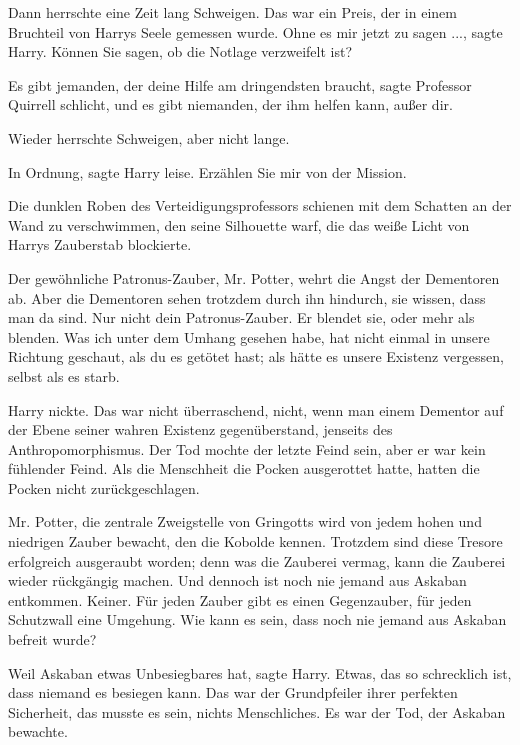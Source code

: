 Dann herrschte eine Zeit lang Schweigen. Das war ein Preis, der in einem
Bruchteil von Harrys Seele gemessen wurde. \glqq{}Ohne es mir jetzt zu sagen
...\grqq{}, sagte Harry. \glqq{}Können Sie sagen, ob die Notlage verzweifelt
ist?\grqq{}

\glqq{}Es gibt jemanden, der deine Hilfe am dringendsten braucht\grqq{}, sagte
Professor Quirrell schlicht, \glqq{}und es gibt niemanden, der ihm helfen kann,
außer dir.\grqq{}

Wieder herrschte Schweigen, aber nicht lange.

\glqq{}In Ordnung\grqq{}, sagte Harry leise. \glqq{}Erzählen Sie mir von der
Mission.\grqq{}

Die dunklen Roben des Verteidigungsprofessors schienen mit dem Schatten an der
Wand zu verschwimmen, den seine Silhouette warf, die das weiße Licht von Harrys
Zauberstab blockierte.

\glqq{}Der gewöhnliche Patronus-Zauber, Mr. Potter, wehrt die Angst der
Dementoren ab. Aber die Dementoren sehen trotzdem durch ihn hindurch, sie
wissen, dass man da sind. Nur nicht dein Patronus-Zauber. Er blendet sie, oder
mehr als blenden. Was ich unter dem Umhang gesehen habe, hat nicht einmal in
unsere Richtung geschaut, als du es getötet hast; als hätte es unsere Existenz
vergessen, selbst als es starb.\grqq{}

Harry nickte. Das war nicht überraschend, nicht, wenn man einem Dementor auf der
Ebene seiner wahren Existenz gegenüberstand, jenseits des Anthropomorphismus.
Der Tod mochte der letzte Feind sein, aber er war kein fühlender Feind. Als die
Menschheit die Pocken ausgerottet hatte, hatten die Pocken nicht
zurückgeschlagen.

\glqq{}Mr. Potter, die zentrale Zweigstelle von Gringotts wird von jedem hohen
und niedrigen Zauber bewacht, den die Kobolde kennen. Trotzdem sind diese
Tresore erfolgreich ausgeraubt worden; denn was die Zauberei vermag, kann die
Zauberei wieder rückgängig machen. Und dennoch ist noch nie jemand aus Askaban
entkommen. Keiner. Für jeden Zauber gibt es einen Gegenzauber, für jeden
Schutzwall eine Umgehung. Wie kann es sein, dass noch nie jemand aus Askaban
befreit wurde?\grqq{}

\glqq{}Weil Askaban etwas Unbesiegbares hat\grqq{}, sagte Harry. \glqq{}Etwas, das
so schrecklich ist, dass niemand es besiegen kann.\grqq{} Das war der Grundpfeiler
ihrer perfekten Sicherheit, das musste es sein, nichts Menschliches. Es war der
Tod, der Askaban bewachte.

